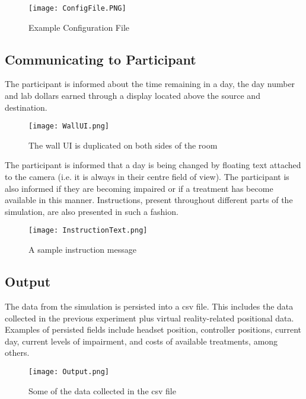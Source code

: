 \documentclass{article}
\begin{document}
\begin{figure}[h!]
\centering
\texttt{[image: ConfigFile.PNG]}
\caption{Example Configuration File}
\label{fig:configfile}
\end{figure}

\pagebreak \subsection{Communicating to Participant}
The participant is informed about the time remaining in a day, the day number and lab dollars earned through a display located above the source and destination. 

\begin{figure}[h!]
\centering
\texttt{[image: WallUI.png]}
\caption{The wall UI is duplicated on both sides of the room}
\label{fig:configfile}
\end{figure}

The participant is informed that a day is being changed by floating text attached to the camera (i.e. it is always in their centre field of view). The participant is also informed if they are becoming impaired or if a treatment has become available in this manner. Instructions, present throughout different parts of the simulation, are also presented in such a fashion.

\begin{figure}[h!]
\centering
\texttt{[image: InstructionText.png]}
\caption{A sample instruction message}
\label{fig:configfile}
\end{figure}

\subsection{Output}
The data from the simulation is persisted into a csv file. This includes the data collected in the previous experiment plus virtual reality-related positional data. Examples of persisted fields include headset position, controller positions, current day, current levels of impairment, and costs of available treatments, among others.

\begin{figure}[h!]
\centering
\texttt{[image: Output.png]}
\caption{Some of the data collected in the csv file}
\label{fig:flowchart}
\end{figure}

\end{document}
